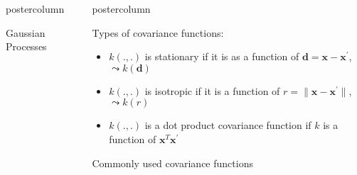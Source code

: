 \documentclass{beamer}
\newlength{\columnheight} %
\begin{document}
\begin{frame}[fragile]{}
\begin{columns}
\begin{column}{.31\textwidth}
\begin{beamercolorbox}[center]{postercolumn}
\begin{minipage}{.98\textwidth}
{\begin{myblock}{Gaussian Processes}
\end{myblock}\vfill
				}
			\end{minipage}
		\end{beamercolorbox}
	\end{column}
	\begin{column}{.31\textwidth}
		\begin{beamercolorbox}[center]{postercolumn}
			\begin{minipage}{.98\textwidth}
				\parbox[t][\columnheight]{\textwidth}{
\begin{myblock}{}  
%
	Types of covariance functions:
	\begin{itemize}
		\setlength{\itemindent}{+.3in}
		\item $k(.,.)$ is stationary if it is as a function of $\bm{d} = \bm{x} - \bm{x}^\prime$, $ \leadsto k(\bm{d})$
		\item $k(.,.)$ is isotropic if it is a function of $r = \|\bm{x} - \bm{x}^\prime\|$,  $ \leadsto k(r)$
		\item $k(., .)$ is a dot product covariance function if $k$ is a function of $\bm{x}^T \bm{x}^\prime$
	\end{itemize}
%
	Commonly used covariance functions
	
	\begin{center}
			\\
	\end{center}
		



\end{myblock}}
\end{minipage}
\end{beamercolorbox}
\end{column}
\end{columns}
\end{frame}
\end{document}
